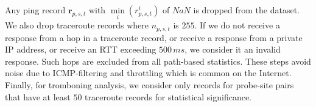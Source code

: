\documentclass[sigconf,anonymous,10pt]{acmart}
\begin{document}
Any ping record $\mathbf{r}_{p, s, t}$ with $\min\limits_{i}(r_{p, s, t}^i)$ of $NaN$ is dropped from the dataset. %
We also drop traceroute records where $n_{p, s, t}$ is $255$. If we do not receive a response from a hop in a traceroute record, or receive a response from a private IP address, or receive an RTT exceeding $500\,ms$, we consider it an invalid response. Such hops are excluded from all path-based statistics. These steps avoid noise due to ICMP-filtering and throttling which is common on the Internet. Finally, for tromboning analysis, we consider only records for probe-site pairs that have at least $50$ traceroute records for statistical significance.
\end{document}
